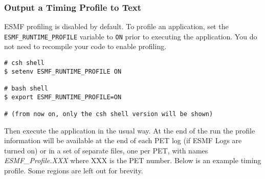 %


\subsubsection{Output a Timing Profile to Text}
\label{sec:BasicProfiling}

ESMF profiling is disabled by default. To profile an application,
set the {\tt ESMF\_RUNTIME\_PROFILE} variable to {\tt ON} prior
to executing the application.  You do not need to recompile
your code to enable profiling.

\begin{verbatim}
# csh shell
$ setenv ESMF_RUNTIME_PROFILE ON

# bash shell
$ export ESMF_RUNTIME_PROFILE=ON

# (from now on, only the csh shell version will be shown)
\end{verbatim}

Then execute the application in the usual way. At the end of
the run the profile information will be available at the end
of each PET log (if ESMF Logs are turned on) or in a set of
separate files, one per PET, with names {\em ESMF\_Profile.XXX}
where XXX is the PET number.  Below is an example timing
profile.  Some regions are left out for brevity.


